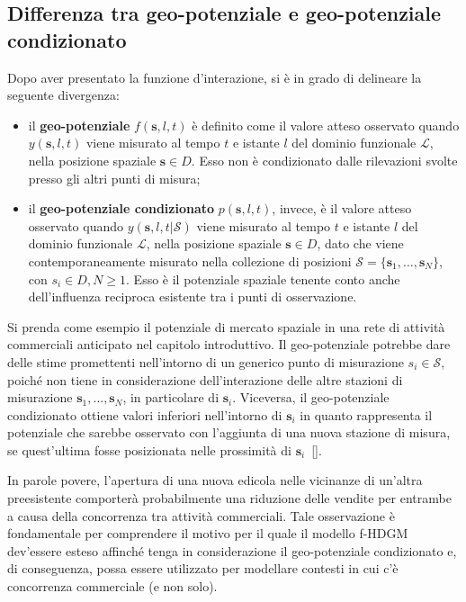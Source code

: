 \subsection[Differenza tra geo-potenziale e geo-potenziale condizionato]{Differenza tra geo-potenziale e geo-potenziale condizionato}
Dopo aver presentato la funzione d'interazione, si è in grado di delineare la seguente divergenza:
\begin{itemize}
	\item il \textbf{geo-potenziale}  $f(\mathbf{s}, l, t)$ è definito come il valore atteso osservato quando $y(\mathbf{s}, l, t)$ viene misurato al tempo $t$ e istante $l$ del dominio funzionale $\mathcal{L}$, nella posizione spaziale $\mathbf{s} \in D$. Esso non è condizionato dalle rilevazioni svolte presso gli altri punti di misura;
	\item il \textbf{geo-potenziale condizionato} $p(\mathbf{s}, l, t)$, invece, è il valore atteso osservato quando $y(\mathbf{s}, l, t| \mathcal{S})$
	viene misurato al tempo $t$ e istante $l$ del dominio funzionale $\mathcal{L}$, nella posizione spaziale $\mathbf{s} \in D$, dato che viene contemporaneamente misurato nella collezione di posizioni $\mathcal{S} = \{\mathbf{s}_1, \ldots, \mathbf{s}_N\}$,  con $s_i \in D, N \geq 1$. Esso è il potenziale spaziale tenente conto anche dell'influenza reciproca esistente tra i punti di osservazione.
\end{itemize}
Si prenda come esempio il potenziale di mercato spaziale in  una rete di attività commerciali anticipato nel capitolo introduttivo. Il geo-potenziale potrebbe dare delle stime promettenti nell'intorno di un generico punto di misurazione $s_i \in\mathcal{S}$, poiché non tiene in considerazione dell'interazione delle altre stazioni di misurazione $\mathbf{s}_1, \ldots, \mathbf{s}_N$, in particolare di $\mathbf{s}_i$. Viceversa, il geo-potenziale condizionato ottiene valori inferiori nell'intorno di $\mathbf{s}_i$ in quanto rappresenta il potenziale che sarebbe osservato con l'aggiunta di una  nuova stazione di misura, se quest'ultima fosse posizionata nelle prossimità di $\mathbf{s}_i$~[\cite{paper_GPM}].\par In parole povere, l'apertura di una nuova edicola nelle vicinanze di un'altra preesistente comporterà probabilmente una riduzione delle vendite per entrambe a causa della concorrenza tra attività commerciali. Tale osservazione è fondamentale per comprendere il motivo per il quale il modello f-HDGM dev'essere esteso affinché tenga in considerazione il geo-potenziale condizionato e, di conseguenza, possa essere utilizzato per modellare contesti in cui c'è concorrenza commerciale (e non solo).


